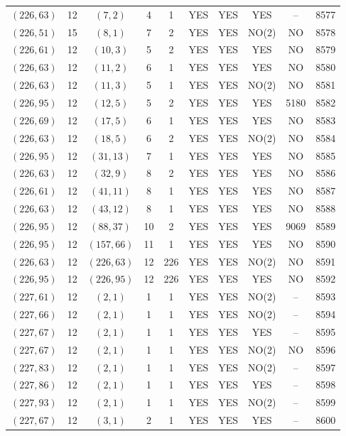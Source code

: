 \begin{longtable}{|c|c|c|c|c|c|c|c|c|c|}
$(226, 63)$ & 12 & $(7, 2)$ & 4 & 1 & YES & YES & YES & -- & 8577\\
$(226, 51)$ & 15 & $(8, 1)$ & 7 & 2 & YES & YES & NO(2) & NO & 8578\\
$(226, 61)$ & 12 & $(10, 3)$ & 5 & 2 & YES & YES & YES & NO & 8579\\
$(226, 63)$ & 12 & $(11, 2)$ & 6 & 1 & YES & YES & YES & NO & 8580\\
$(226, 63)$ & 12 & $(11, 3)$ & 5 & 1 & YES & YES & NO(2) & NO & 8581\\
$(226, 95)$ & 12 & $(12, 5)$ & 5 & 2 & YES & YES & YES & 5180 & 8582\\
$(226, 69)$ & 12 & $(17, 5)$ & 6 & 1 & YES & YES & YES & NO & 8583\\
$(226, 63)$ & 12 & $(18, 5)$ & 6 & 2 & YES & YES & NO(2) & NO & 8584\\
$(226, 95)$ & 12 & $(31, 13)$ & 7 & 1 & YES & YES & YES & NO & 8585\\
$(226, 63)$ & 12 & $(32, 9)$ & 8 & 2 & YES & YES & YES & NO & 8586\\
$(226, 61)$ & 12 & $(41, 11)$ & 8 & 1 & YES & YES & YES & NO & 8587\\
$(226, 63)$ & 12 & $(43, 12)$ & 8 & 1 & YES & YES & YES & NO & 8588\\
$(226, 95)$ & 12 & $(88, 37)$ & 10 & 2 & YES & YES & YES & 9069 & 8589\\
$(226, 95)$ & 12 & $(157, 66)$ & 11 & 1 & YES & YES & YES & NO & 8590\\
$(226, 63)$ & 12 & $(226, 63)$ & 12 & 226 & YES & YES & NO(2) & NO & 8591\\
$(226, 95)$ & 12 & $(226, 95)$ & 12 & 226 & YES & YES & YES & NO & 8592\\
$(227, 61)$ & 12 & $(2, 1)$ & 1 & 1 & YES & YES & NO(2) & -- & 8593\\
$(227, 66)$ & 12 & $(2, 1)$ & 1 & 1 & YES & YES & NO(2) & -- & 8594\\
$(227, 67)$ & 12 & $(2, 1)$ & 1 & 1 & YES & YES & YES & -- & 8595\\
$(227, 67)$ & 12 & $(2, 1)$ & 1 & 1 & YES & YES & NO(2) & NO & 8596\\
$(227, 83)$ & 12 & $(2, 1)$ & 1 & 1 & YES & YES & NO(2) & -- & 8597\\
$(227, 86)$ & 12 & $(2, 1)$ & 1 & 1 & YES & YES & YES & -- & 8598\\
$(227, 93)$ & 12 & $(2, 1)$ & 1 & 1 & YES & YES & NO(2) & -- & 8599\\
$(227, 67)$ & 12 & $(3, 1)$ & 2 & 1 & YES & YES & YES & -- & 8600\\

\end{longtable}
